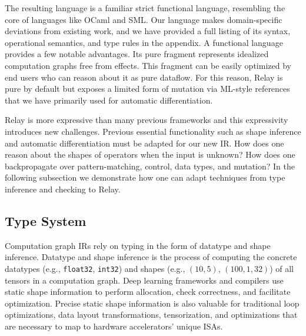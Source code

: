   The resulting language is a familiar strict functional language,
    resembling the core of languages like OCaml and SML.
  Our language makes domain-specific deviations from existing work,
    and we have provided a full listing
    of its syntax, operational semantics, and type rules
    in the appendix.
  A functional language provides a few notable advantages.
  Its pure fragment represents idealized computation graphs free
    from effects. This fragment can be easily optimized by end users who
    can reason about it as pure dataflow.
  For this reason, Relay is pure by default but exposes a limited
    form of mutation via ML-style references that we have
    primarily used for automatic differentiation.

  Relay is more expressive than many previous frameworks and this expressivity introduces new challenges.
    Previous essential functionality such
     as shape inference and automatic differentiation must be adapted for
     our new IR.
  How does one reason about the shapes of operators when the input is unknown?
  How does one backpropagate over pattern-matching, control, data types, and mutation?
  In the following subsection we demonstrate how one can adapt techniques
    from type inference and checking to Relay.

  \subsection{Type System}
  \label{subsec:type_system}

  Computation graph IRs rely on typing in the form of
    datatype and shape inference.
  Datatype and shape inference is the process of computing the
    concrete datatypes (e.g., \verb|float32|, \verb|int32|) and shapes (e.g., $(10, 5)$, $(100, 1, 32)$) of all
    tensors in a computation graph.
  Deep learning frameworks and compilers use static shape information
    to perform allocation, check correctness, and facilitate optimization.
  Precise static shape information is also valuable for traditional loop
    optimizations, data layout transformations, tensorization, and
    optimizations that are necessary to map to hardware accelerators' unique ISAs.

